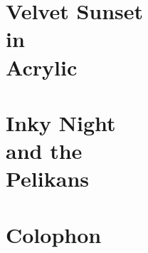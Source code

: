 \documentclass[12pt]{memoir}
\begin{document}
\chapter[Velvet Sunset in Acrylic]
{Velvet Sunset\\
in\\
Acrylic}
\lipsum[101-120]

\chapter[Inky Night and the Pelikans]
{Inky Night\\
and the\\
Pelikans}
\lipsum[121-140]

\backmatter
\appendix

\chapter{Colophon}
\thispagestyle{empty}
\lipsum[141-144]
\end{document}
